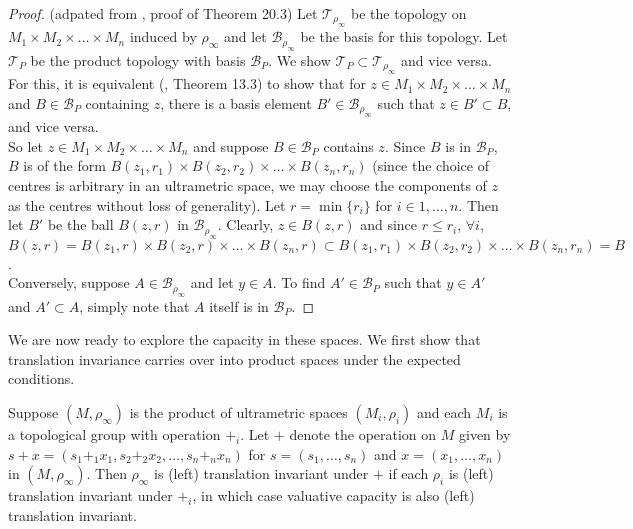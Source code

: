 \begin{proof}
	(adpated from \cite{mun}, proof of Theorem 20.3) Let $\mathcal{T}_{\rho_\infty}$ be the topology on $M_{1} \times M_{2} \times \ldots \times M_{n}$ induced by $\rho_\infty$ and let $\mathcal{B}_{\rho_\infty}$ be the basis for this topology. Let $\mathcal{T}_{P}$ be the product topology with basis $\mathcal{B}_P$. We show $\mathcal{T}_{P} \subset \mathcal{T}_{\rho_\infty}$ and vice versa. For this, it is equivalent (\cite{mun}, Theorem 13.3) to show that for $z \in  M_{1} \times M_{2} \times \ldots \times M_{n}$ and $B \in \mathcal{B}_{P}$ containing $z$, there is a basis element $B' \in \mathcal{B}_{\rho_\infty}$ such that $z \in B' \subset B$, and vice versa.\\
	
	So let  $z \in M_{1} \times M_{2} \times \ldots \times M_{n}$ and suppose $B \in \mathcal{B}_{P}$ contains $z$. Since $B$ is in $\mathcal{B}_{P}$, $B$ is of the form $B(z_1,r_1) \times B(z_2,r_2) \times \ldots \times B(z_n,r_n)$ (since the choice of centres is arbitrary in an ultrametric space, we may choose the components of $z$ as the centres without loss of generality). Let $r=\min \{r_i\}$ for $i \in 1,\ldots, n$. Then let $B'$ be the ball $B(z,r)$ in $ \mathcal{B}_{\rho_\infty}$. Clearly, $z \in B(z,r)$ and since $r \leq r_i$, $\forall i$, $B(z,r) = B(z_1,r) \times B(z_2,r) \times \ldots \times B(z_n,r) \subset  B(z_1,r_1) \times B(z_2,r_2) \times \ldots \times B(z_n,r_n) =B$.\\
	
	Conversely, suppose $A \in \mathcal{B}_{\rho_\infty}$ and let $y \in A$. To find $A' \in \mathcal{B}_{P}$ such that $y \in A'$ and $A' \subset A$, simply note that $A$ itself is in $\mathcal{B}_{P}$.
	
\end{proof}

We are now ready to explore the capacity in these spaces. We first show that translation invariance carries over into product spaces under the expected conditions.\\ 

\begin{proposition}
Suppose $(M,\rho_\infty)$ is the product of ultrametric spaces $(M_i, \rho_i)$ and each $M_i$ is a topological group with operation $+_i$. Let $+$ denote the operation on $M$ given by $s+x = (s_1 + _1 x_1, s_2 +_2 x_2, \ldots, s_n +_nx_n)$ for $s = (s_1,\ldots,s_n)$ and $x =(x_1,\ldots,x_n)$ in $(M, \rho_\infty)$. Then $\rho_\infty$ is (left) translation invariant under $+$ if each $\rho_i$ is (left) translation invariant under $+_i$, in which case valuative capacity is also (left) translation invariant.
\end{proposition}

